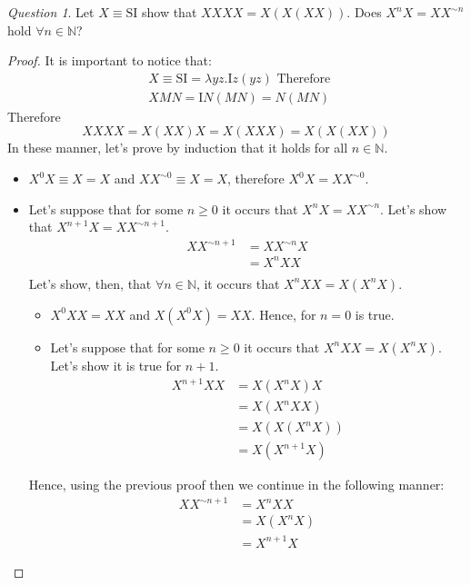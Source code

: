 \documentclass[11pt]{article}
\theoremstyle{definition}
\theoremstyle{remark}
\theoremstyle{remark}
\newtheorem{question}{Question}
\theoremstyle{definition}
\newcommand{\N}{\mathbb{N}}
\renewcommand{\S}{\pmb{\mathrm{S}}}
\newcommand{\I}{\pmb{\mathrm{I}}}
\begin{document}
\begin{question}
  Let $X\equiv\S\I$ show that $XXXX = X(X(XX))$. Does $X^nX = XX^{\sim n}$ hold
  $\forall n \in \N$?
  \begin{proof}
    It is important to notice that:
    \begin{align*}
      &X \equiv \S\I = \lambda yz. \I z(yz) \text{ Therefore } \\
      &XMN = \I N (M N) = N (M N)
    \end{align*}
    Therefore
    \begin{equation*}
      XXXX = X(XX)X = X (XXX) = X(X(XX))
    \end{equation*}
    In these manner, let's prove by induction that it holds for all $n \in \N$.
    \begin{itemize}
      \item $X^0X \equiv X = X$ and $XX^{\sim 0} \equiv X = X$, therefore
            $X^0X = XX^{\sim 0}$.
      \item Let's suppose that for some $n \ge 0$ it occurs that
            $X^nX = XX^{\sim n}$. Let's show that
            $X^{n + 1}X = XX^{\sim n + 1}$.
            \begin{align*}
              XX^{\sim n + 1} &= XX^{\sim n}X \\
                              &= X^nXX \\
            \end{align*}
            Let's show, then, that $\forall n \in \N$, it occurs that
            $X^nXX = X(X^nX)$.
            \begin{itemize}
              \item $X^0XX = XX$ and $X(X^0X) = XX$. Hence, for $n=0$ is true.
              \item Let's suppose that for some $n \ge 0$ it occurs that
                    $X^nXX = X(X^nX)$. Let's show it is true for $n + 1$.
                    \begin{align*}
                      X^{n+1}XX &= X(X^nX)X \\
                                &= X(X^nXX) \\
                                &= X(X(X^nX)) \\
                                &= X(X^{n + 1}X)
                    \end{align*}
            \end{itemize}
            Hence, using the previous proof then we continue in the following
            manner:
            \begin{align*}
              XX^{\sim n + 1} &= X^nXX \\
                              &= X(X^nX) \\
                              &=X^{n + 1}X
            \end{align*}
    \end{itemize}
  \end{proof}
\end{question}
\end{document}
